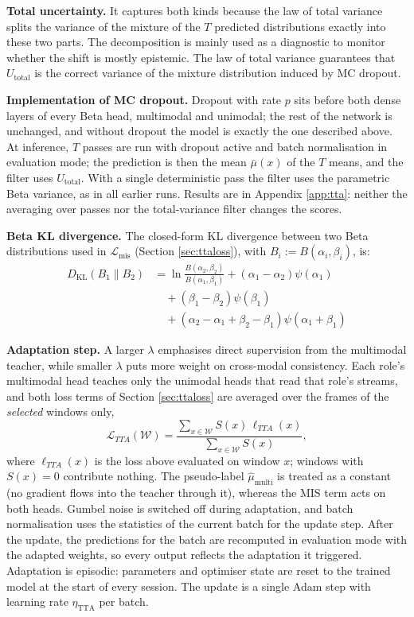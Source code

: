 \documentclass[10pt,a4paper,twocolumn]{article}
\begin{document}
	\textbf{Total uncertainty.} It captures both kinds because the law of total variance splits the variance of the mixture of the $T$ predicted distributions exactly into these two parts. The decomposition is mainly used as a diagnostic to monitor whether the shift is mostly epistemic. The law of total variance guarantees that $U_{\text{total}}$ is the correct variance of the mixture distribution induced by MC dropout.

	\textbf{Implementation of MC dropout.} Dropout with rate $p$ sits before both dense layers of every Beta head, multimodal and unimodal; the rest of the network is unchanged, and without dropout the model is exactly the one described above. At inference, $T$ passes are run with dropout active and batch normalisation in evaluation mode; the prediction is then the mean $\bar\mu(x)$ of the $T$ means, and the filter uses $U_{\text{total}}$. With a single deterministic pass the filter uses the parametric Beta variance, as in all earlier runs. Results are in Appendix \ref{app:tta}: neither the averaging over passes nor the total-variance filter changes the scores.

	\textbf{Beta KL divergence.} The closed-form KL divergence between two Beta distributions used in $\mathcal{L}_{\text{mis}}$ (Section \ref{sec:ttaloss}), with $ B_i := B(\alpha_i,\beta_i) $, is:
	\begin{equation}
		\label{eq:beta_kl}
		\begin{aligned}D_{\text{KL}}(B_1 \parallel B_2) &= \ln \frac{B(\alpha_2,\beta_2)}{B(\alpha_1,\beta_1)} + (\alpha_1 - \alpha_2)\psi(\alpha_1) \\ &\quad + (\beta_1 - \beta_2)\psi(\beta_1) \\ &\quad + (\alpha_2 - \alpha_1 + \beta_2 - \beta_1)\psi(\alpha_1 + \beta_1)\end{aligned}
	\end{equation}

	\textbf{Adaptation step.} A larger $\lambda$ emphasises direct supervision from the multimodal teacher, while smaller $\lambda$ puts more weight on cross-modal consistency. Each role's multimodal head teaches only the unimodal heads that read that role's streams, and both loss terms of Section \ref{sec:ttaloss} are averaged over the frames of the \emph{selected} windows only,
	$$\mathcal{L}_{TTA}(\mathcal{W}) = \frac{\sum_{x \in \mathcal{W}} S(x)\,\ell_{TTA}(x)}{\sum_{x \in \mathcal{W}} S(x)},$$
	where $\ell_{TTA}(x)$ is the loss above evaluated on window $x$; windows with $S(x) = 0$ contribute nothing. The pseudo-label $\hat{\mu}_{\text{multi}}$ is treated as a constant (no gradient flows into the teacher through it), whereas the MIS term acts on both heads. Gumbel noise is switched off during adaptation, and batch normalisation uses the statistics of the current batch for the update step. After the update, the predictions for the batch are recomputed in evaluation mode with the adapted weights, so every output reflects the adaptation it triggered. Adaptation is episodic: parameters and optimiser state are reset to the trained model at the start of every session. The update is a single Adam step with learning rate $\eta_{\text{TTA}}$ per batch.
\end{document}
